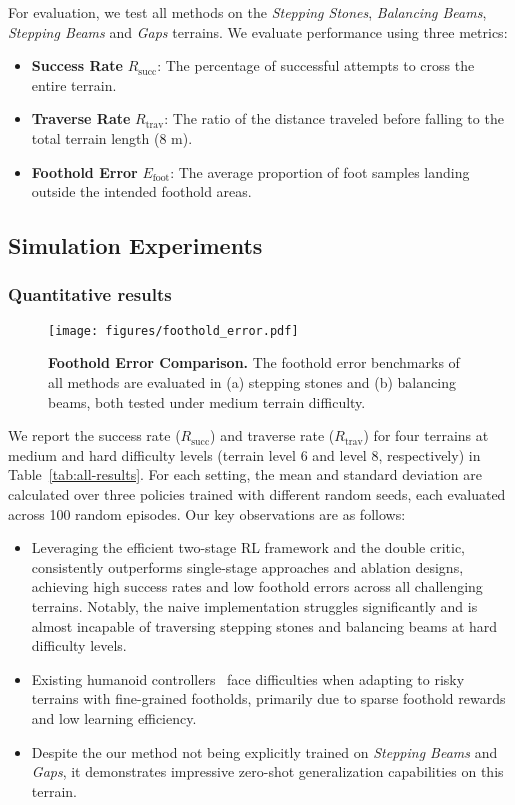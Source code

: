 For evaluation, we test all methods on the \textit{Stepping Stones}, \textit{Balancing Beams}, \textit{Stepping Beams} and \textit{Gaps} terrains. We evaluate performance using three metrics:
\begin{itemize}
    \item \textbf{Success Rate} $R_\mathrm{succ}$: The percentage of successful attempts to cross the entire terrain.
    \item \textbf{Traverse Rate} $R_\mathrm{trav}$: The ratio of the distance traveled before falling to the total terrain length ($8$ m).
    \item \textbf{Foothold Error} $E_\mathrm{foot}$: The average proportion of foot samples landing outside the intended foothold areas.
\end{itemize}

\subsection{Simulation Experiments}

\subsubsection{Quantitative results}

\begin{figure}[t]
    \centering
    \texttt{[image: figures/foothold\_error.pdf]}
    \caption{\textbf{Foothold Error Comparison.} The foothold error benchmarks of all methods are evaluated in (a) stepping stones and (b) balancing beams, both tested under medium terrain difficulty.}
    \label{fig:foothold_error}
\end{figure}

We report the success rate ($R_\mathrm{succ}$) and traverse rate ($R_\mathrm{trav}$) for four terrains at medium and hard difficulty levels (terrain level 6 and level 8, respectively) in Table~\ref{tab:all-results}. For each setting, the mean and standard deviation are calculated over three policies trained with different random seeds, each evaluated across 100 random episodes. Our key observations are as follows: 

\begin{itemize}
    \item Leveraging the efficient two-stage RL framework and the double critic, \beamdojo consistently outperforms single-stage approaches and ablation designs, achieving high success rates and low foothold errors across all challenging terrains. Notably, the naive implementation struggles significantly and is almost incapable of traversing stepping stones and balancing beams at hard difficulty levels.
    \item Existing humanoid controllers~\cite{long2024learninghumanoid} face difficulties when adapting to risky terrains with fine-grained footholds, primarily due to sparse foothold rewards and low learning efficiency.
    \item Despite the our method not being explicitly trained on \textit{Stepping Beams} and \textit{Gaps}, it demonstrates impressive zero-shot generalization capabilities on this terrain.
\end{itemize}

